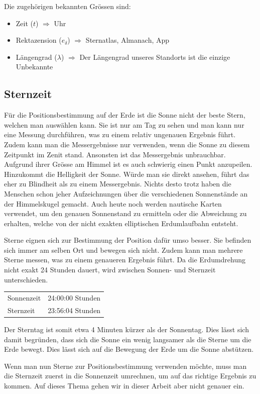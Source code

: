 \begin{refsection}
Die zugehörigen bekannten Grössen sind:
\begin{itemize}
\item Zeit ($t$) $\Rightarrow$ Uhr
\item Rektazension ($e_\delta$) $\Rightarrow$ Sternatlas, Almanach, App 
\item Längengrad ($\lambda$) $\Rightarrow$ Der Längengrad unseres Standorts ist die einzige Unbekannte
\end{itemize}


\subsection{Sternzeit}
Für die Positionsbestimmung auf der Erde ist die Sonne nicht der beste Stern, welchen man auswählen kann. Sie ist nur am Tag zu sehen und man kann nur eine Messung durchführen, was zu einem relativ ungenauen Ergebnis führt. Zudem kann man die Messergebnisse nur verwenden, wenn die Sonne zu diesem Zeitpunkt im Zenit stand. Ansonsten ist das Messergebnis unbrauchbar. Aufgrund ihrer Grösse am Himmel ist es auch schwierig einen Punkt anzupeilen. Hinzukommt die Helligkeit der Sonne. Würde man sie direkt ansehen, führt das eher zu Blindheit als zu einem Messergebnis.
Nichts desto trotz haben die Menschen schon jeher Aufzeichnungen über die verschiedenen Sonnenstände an der Himmelskugel gemacht. Auch heute noch werden nautische Karten verwendet, um den genauen Sonnenstand zu ermitteln oder die Abweichung zu erhalten, welche von der nicht exakten elliptischen Erdumlaufbahn entsteht.

Sterne eignen sich zur Bestimmung der Position dafür umso besser. Sie befinden sich immer am selben Ort und bewegen sich nicht. Zudem kann man mehrere Sterne messen, was zu einem genaueren Ergebnis führt. Da die Erdumdrehung nicht exakt 24 Stunden dauert, wird zwischen Sonnen- und Sternzeit unterschieden.
\begin{center}
\begin{tabular}{ll}
Sonnenzeit & 24:00:00 Stunden \\
Sternzeit & 23:56:04 Stunden
\end{tabular}
\end{center}

Der Sterntag ist somit etwa 4 Minuten kürzer als der Sonnentag. Dies lässt sich damit begründen, dass sich die Sonne ein wenig langsamer als die Sterne um die Erde bewegt. Dies lässt sich auf die Bewegung der Erde um die Sonne abstützen.

Wenn man nun Sterne zur Positionsbestimmung verwenden möchte, muss man die Sternzeit zuerst in die Sonnenzeit umrechnen, um auf das richtige Ergebnis zu kommen. Auf dieses Thema gehen wir in dieser Arbeit aber nicht genauer ein.



\end{refsection}
